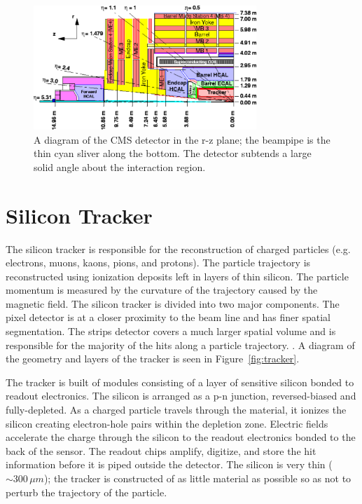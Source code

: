 \begin{figure}
\centering
\includegraphics[width=0.75\textwidth]{figs/img41.pdf}
\caption[A diagram of the CMS detector in the r-z plane.]{A diagram of the CMS detector in the r-z plane; the beampipe is the thin cyan sliver along the bottom. The detector subtends a large solid angle about the interaction region.}
\label{fig:detectoreta}
\end{figure}

\section{Silicon Tracker}

The silicon tracker is responsible for the reconstruction of charged particles (e.g. electrons, muons, kaons, pions, and protons). The particle trajectory is reconstructed using ionization deposits left in layers of thin silicon. The particle momentum is measured by the curvature of the trajectory caused by the magnetic field. The silicon tracker is divided into two major components. The pixel detector is at a closer proximity to the beam line and has finer spatial segmentation. The strips detector covers a much larger spatial volume and is responsible for the majority of the hits along a particle trajectory. \cite{trackertdr, trackertdradd}. A diagram of the geometry and layers of the tracker is seen in Figure~\ref{fig:tracker}.

The tracker is built of modules consisting of a layer of sensitive silicon bonded to readout electronics. The silicon is arranged as a p-n junction, reversed-biased and fully-depleted. As a charged particle travels through the material, it ionizes the silicon creating electron-hole pairs within the depletion zone. Electric fields accelerate the charge through the silicon to the readout electronics bonded to the back of the sensor. The readout chips amplify, digitize, and store the hit information before it is piped outside the detector. The silicon is very thin ($\sim300\,\mu m$); the tracker is constructed of as little material as possible so as not to perturb the trajectory of the particle.


